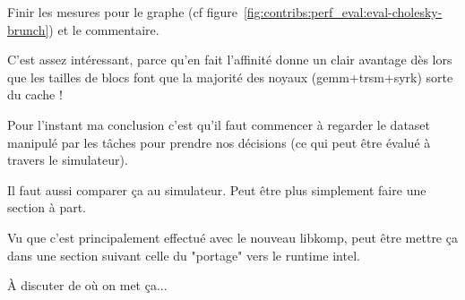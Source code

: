 \begin{todo}
Finir les mesures pour le graphe (cf figure~\ref{fig:contribs:perf_eval:eval-cholesky-brunch}) et le commentaire.

C'est assez intéressant, parce qu'en fait l'affinité donne un clair avantage dès lors que les tailles de blocs font que la majorité des noyaux (gemm+trsm+syrk) sorte du cache !

Pour l'instant ma conclusion c'est qu'il faut commencer à regarder le dataset manipulé par les tâches pour prendre nos décisions (ce qui peut être évalué à travers le simulateur).
\end{todo}


\begin{todo}
  Il faut aussi comparer ça au simulateur. Peut être plus simplement faire une section à part.

  Vu que c'est principalement effectué avec le nouveau libkomp, peut être mettre ça dans une section suivant celle du "portage" vers le runtime intel.

  À discuter de où on met ça...
\end{todo}


